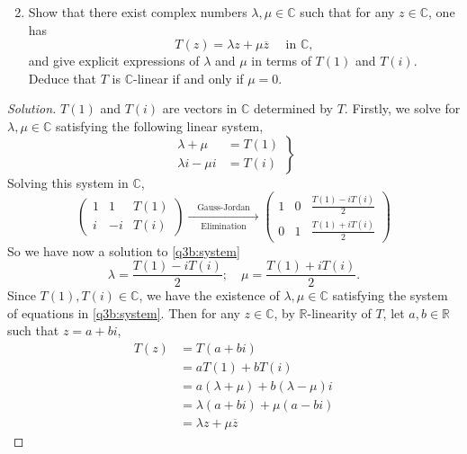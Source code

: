 \documentclass{article}
\theoremstyle{definition}
\numberwithin{lemma}{problem}
\numberwithin{equation}{problem}
\newenvironment{solution}{
    \renewcommand{\qedsymbol}{$\blacksquare$}
    \begin{proof}[Solution]
    }
    {
    \end{proof}
}
\newcommand{\R}{\mathbb{R}}
\newcommand{\C}{\mathbb{C}}
\newcommand{\conj}[1]{\overline{#1}}
\begin{document}
\begin{enumerate}[label=(\alph*)] \setcounter{enumi}{1}
    \item Show that there exist complex numbers $\lambda,\mu \in \C$ such that
        for any $z\in \C$, one has
        $$T(z) = \lambda z + \mu \conj{z} \quad \text{ in }\C,$$ and
        give explicit expressions of $\lambda$ and $\mu$ in terms of $T(1)$ and $T(i)$.
        Deduce that $T$ is $\C$-linear if and only if $\mu = 0$.
\end{enumerate}
\begin{solution}
    $T(1)$ and $T(i)$ are vectors in $\C$ determined by $T$.
    Firstly, we solve for $\lambda,\mu \in \C$ satisfying the following linear system,
    \begin{equation}    \label{q3b:system}
        \left.
        \begin{aligned}
            \lambda   + \mu   &= T(1)    \\
            \lambda i - \mu i &= T(i)
        \end{aligned}
        \right\}
    \end{equation}
    Solving this system in $\C$,
    \[
        \left(\begin{array}{cc|c}
            1 & 1 & T(1)\\
            i & -i & T(i)
        \end{array}\right)
        \xrightarrow[\text{Elimination}]{\quad\text{Gauss-Jordan}\quad}
        \left(\begin{array}{cc|c}
            1 & 0 & \frac{T(1)-iT(i)}{2}   \\
            0 & 1 & \frac{T(1)+iT(i)}{2}
        \end{array}\right)
    \]
    So we have now a solution to \eqref{q3b:system}
    $$ \lambda = \frac{T(1)-iT(i)}{2}; \quad \mu=\frac{T(1)+iT(i)}{2}. $$
    Since $T(1), T(i) \in \C$, we have the existence of $\lambda, \mu \in \C$
    satisfying the system of equations in \eqref{q3b:system}.
    Then for any $z\in\C$, by $\R$-linearity of $T$,
    let $a,b\in \R$ such that $z=a+bi$,
    \begin{align*}
        T(z) &= T(a+bi) \\
        &= aT(1) + bT(i)\\
        &= a(\lambda + \mu) + b(\lambda - \mu)i\\
        &= \lambda(a+bi) + \mu(a-bi)\\
        &= \lambda z + \mu \conj{z} \tag*{\qedhere}
    \end{align*}
\end{solution}
\end{document}
